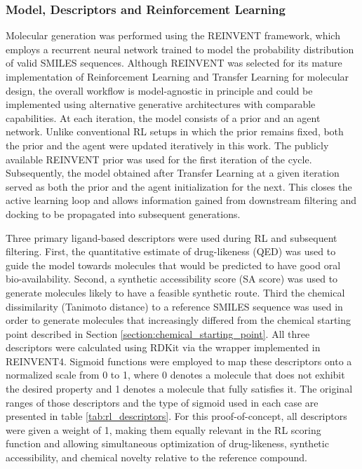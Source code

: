 \subsubsection{Model, Descriptors and Reinforcement Learning}
Molecular generation was performed using the REINVENT framework, which employs a recurrent neural network trained to model the probability distribution of valid SMILES sequences\cite{Blaschke2020ReinventDesign,Loeffler2024OptimalSimulations}. Although REINVENT was selected for its mature implementation of Reinforcement Learning and Transfer Learning for molecular design, the overall workflow is model-agnostic in principle and could be implemented using alternative generative architectures with comparable capabilities. At each iteration, the model consists of a prior and an agent network. Unlike conventional RL setups in which the prior remains fixed, both the prior and the agent were updated iteratively in this work. The publicly available REINVENT prior\cite{LofflerREINVENT4Priors} was used for the first iteration of the cycle. Subsequently, the model obtained after Transfer Learning at a given iteration served as both the prior and the agent initialization for the next. This closes the active learning loop and allows information gained from downstream filtering and docking to be propagated into subsequent generations. 

Three primary ligand-based descriptors were used during RL and subsequent filtering. First, the quantitative estimate of drug-likeness (QED)\cite{Wildman1999PredictionContributions,Bickerton2012QuantifyingDrugs} was used to guide the model towards molecules that would be predicted to have good oral bio-availability. Second, a synthetic accessibility score (SA score) was used to generate molecules likely to have a feasible synthetic route\cite{Ertl2009EstimationContributions}. Third the chemical dissimilarity (Tanimoto distance) to a reference SMILES sequence was used in order to generate molecules that increasingly differed from the chemical starting point described in Section \ref{section:chemical_starting_point}. All three descriptors were calculated using RDKit\cite{RDKit:Chemoinformatics} via the wrapper implemented in REINVENT4. Sigmoid functions were employed to map these descriptors onto a normalized scale from 0 to 1, where 0 denotes a molecule that does not exhibit the desired property and 1 denotes a molecule that fully satisfies it. The original ranges of those descriptors and the type of sigmoid used in each case are presented in table \ref{tab:rl_descriptors}. For this proof-of-concept, all descriptors were given a weight of 1, making them equally relevant in the RL scoring function and allowing simultaneous optimization of drug-likeness, synthetic accessibility, and chemical novelty relative to the reference compound.

